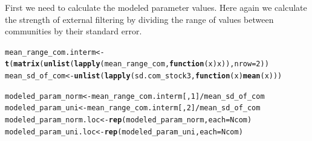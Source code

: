 \documentclass[12pt]{article}\usepackage[]{graphicx}\usepackage[]{color}
\makeatletter
\newcommand{\hlnum}[1]{\textcolor[rgb]{0.686,0.059,0.569}{#1}}%
\newcommand{\hlopt}[1]{\textcolor[rgb]{0,0,0}{#1}}%
\newcommand{\hlstd}[1]{\textcolor[rgb]{0.345,0.345,0.345}{#1}}%
\newcommand{\hlkwa}[1]{\textcolor[rgb]{0.161,0.373,0.58}{\textbf{#1}}}%
\newcommand{\hlkwb}[1]{\textcolor[rgb]{0.69,0.353,0.396}{#1}}%
\newcommand{\hlkwc}[1]{\textcolor[rgb]{0.333,0.667,0.333}{#1}}%
\newcommand{\hlkwd}[1]{\textcolor[rgb]{0.737,0.353,0.396}{\textbf{#1}}}%
\newenvironment{kframe}{%
 \def\at@end@of@kframe{}%
 \ifinner\ifhmode%
  \def\at@end@of@kframe{\end{minipage}}%
  \begin{minipage}{\columnwidth}%
 \fi\fi%
 \def\FrameCommand##1{\hskip\@totalleftmargin \hskip-\fboxsep
 \colorbox{shadecolor}{##1}\hskip-\fboxsep
     \hskip-\linewidth \hskip-\@totalleftmargin \hskip\columnwidth}%
 \MakeFramed {\advance\hsize-\width
   \@totalleftmargin\z@ \linewidth\hsize
   \@setminipage}}%
 {\par\unskip\endMakeFramed%
 \at@end@of@kframe}
\newenvironment{knitrout}{}{} %
\makeatother
\begin{document}
  First we need to calculate the modeled parameter values. Here again we calculate the strength of external filtering by dividing the range of values between communities by their standard error.
  
\begin{knitrout}\small
{}\color{fgcolor}\begin{kframe}
\begin{alltt}
\hlstd{mean_range_com.interm} \hlkwb{<-} \hlkwd{t}\hlstd{(}\hlkwd{matrix}\hlstd{(}\hlkwd{unlist}\hlstd{(}\hlkwd{lapply}\hlstd{(mean_range_com,} \hlkwa{function}\hlstd{(}\hlkwc{x}\hlstd{) x)),} \hlkwc{nrow} \hlstd{=} \hlnum{2}\hlstd{))}
\hlstd{mean_sd_of_com} \hlkwb{<-} \hlkwd{unlist}\hlstd{(}\hlkwd{lapply}\hlstd{(sd.com_stock3,} \hlkwa{function}\hlstd{(}\hlkwc{x}\hlstd{)} \hlkwd{mean}\hlstd{(x)))}

\hlstd{modeled_param_norm} \hlkwb{<-} \hlstd{mean_range_com.interm[,} \hlnum{1}\hlstd{]} \hlopt{/} \hlstd{mean_sd_of_com}
\hlstd{modeled_param_uni} \hlkwb{<-} \hlstd{mean_range_com.interm[,} \hlnum{2}\hlstd{]} \hlopt{/} \hlstd{mean_sd_of_com}
\hlstd{modeled_param_norm.loc} \hlkwb{<-} \hlkwd{rep}\hlstd{(modeled_param_norm,} \hlkwc{each} \hlstd{= Ncom)}
\hlstd{modeled_param_uni.loc} \hlkwb{<-} \hlkwd{rep}\hlstd{(modeled_param_uni,} \hlkwc{each} \hlstd{= Ncom)}
\end{alltt}
\end{kframe}
\end{knitrout}
\end{document}

